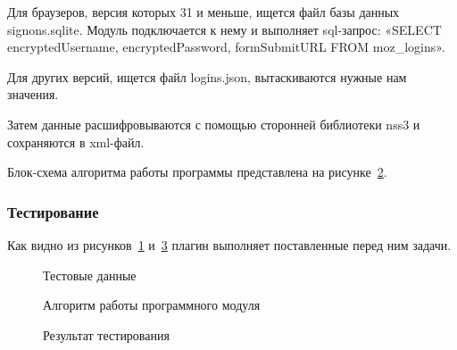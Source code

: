 Для браузеров, версия которых 31 и меньше, ищется файл базы данных signons.sqlite. Модуль подключается к нему и выполняет sql-запрос: «SELECT encryptedUsername, encryptedPassword, formSubmitURL FROM moz\_logins».

Для других версий, ищется файл logins.json, вытаскиваются нужные нам значения.

Затем данные расшифровываются с помощью сторонней библиотеки nss3 и сохраняются в xml-файл.

Блок-схема алгоритма работы программы представлена на рисунке~\ref{teresh_2:teresh_2}.

\subsubsection{Тестирование}

Как видно из рисунков~\ref{teresh_3:teresh_3} и~\ref{teresh_4:teresh_4} плагин выполняет поставленные перед ним задачи.

\begin{figure}[h!]
\caption{Тестовые данные}
\label{teresh_3:teresh_3}
\end{figure}

\begin{figure}[h!]
\caption{Алгоритм работы программного модуля}
\label{teresh_2:teresh_2}
\end{figure}

\clearpage
\begin{figure}[h!]
\caption{Результат тестирования}
\label{teresh_4:teresh_4}
\end{figure}

\clearpage
